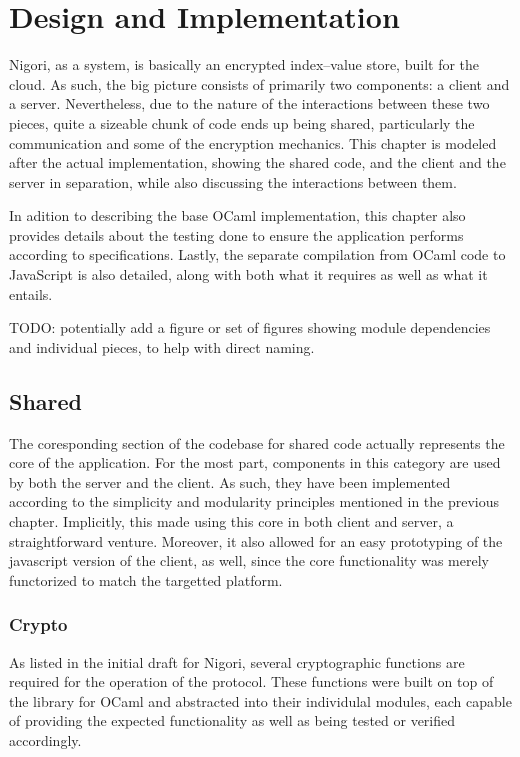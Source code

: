 \chapter{Design and Implementation} \label{chapter:implementation}
Nigori, as a system, is basically an encrypted index--value store, built for the cloud.
As such, the big picture consists of primarily two components: a client and a server.
Nevertheless, due to the nature of the interactions between these two pieces, quite a sizeable chunk of code ends up being shared, particularly the communication and some of the encryption mechanics.
This chapter is modeled after the actual implementation, showing the shared code, and the client and the server in separation, while also discussing the interactions between them.

In adition to describing the base OCaml implementation, this chapter also provides details about the testing done to ensure the application performs according to specifications.
Lastly, the separate compilation from OCaml code to JavaScript is also detailed, along with both what it requires as well as what it entails.

TODO: potentially add a figure or set of figures showing module dependencies and individual pieces, to help with direct naming.

\section{Shared}
The coresponding section of the codebase for shared code actually represents the core of the application.
For the most part, components in this category are used by both the server and the client.
As such, they have been implemented according to the simplicity and modularity principles mentioned in the previous chapter.
Implicitly, this made using this core in both client and server, a straightforward venture.
Moreover, it also allowed for an easy prototyping of the javascript version of the client, as well, since the core functionality was merely functorized to match the targetted platform.

\subsection{Crypto}
As listed in the initial draft for Nigori, several cryptographic functions are required for the operation of the protocol.
These functions were built on top of the  library for OCaml and abstracted into their individulal modules, each capable of providing the expected functionality as well as being tested or verified accordingly.

